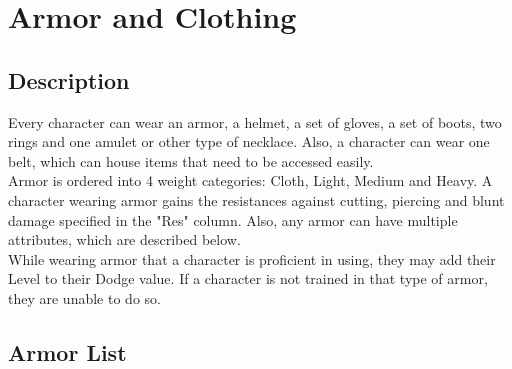 \chapter{Armor and Clothing}\label{ch:armor}
\section{Description}\label{armorDescription}
Every character can wear an armor, a helmet, a set of gloves, a set of boots, two rings and one amulet or other type of necklace.
Also, a character can wear one belt, which can house items that need to be accessed easily.\\
Armor is ordered into 4 weight categories: Cloth, Light, Medium and Heavy.
A character wearing armor gains the resistances against cutting, piercing and blunt damage specified in the "Res" column.
Also, any armor can have multiple attributes, which are described below.\\
While wearing armor that a character is proficient in using, they may add their Level to their Dodge value.
If a character is not trained in that type of armor, they are unable to do so.

\section{Armor List}\label{armorList}




















